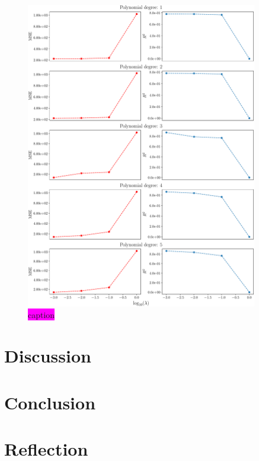 \documentclass[aps,pra,english,notitlepage,reprint,nofootinbib]{revtex4-1}  %
\begin{document}
\begin{figure}
  \vspace*{-5pt}
  \centering %
  \includegraphics[width=0.9\textwidth]{../figs/c_MSE_R2_vert.pdf}
  \caption{\colorbox{magenta}{caption}}\label{fig:c MSE R2}
  \vspace*{-5pt}
\end{figure}

\section{Discussion}\label{sec:discussion}


\section{Conclusion}\label{sec:conclusion}


\section{Reflection}\label{sec:reflection}
\end{document}
